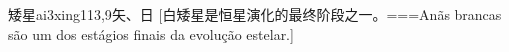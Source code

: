 \begin{EntryWithPhonetic}{矮星}{ai3xing1}{13,9}{⽮、⽇}
  [白矮星是恒星演化的最终阶段之一。===Anãs brancas são um dos estágios finais da evolução estelar.]
\end{EntryWithPhonetic}


